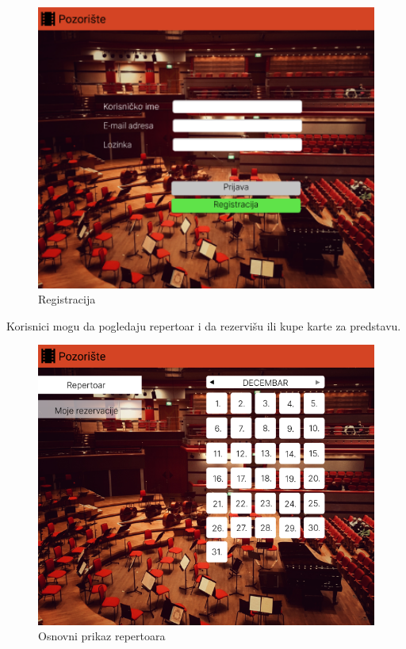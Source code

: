 \documentclass[a4paper]{article}
\begin{document}
\begin{figure}[H]
  \begin{center}
    \includegraphics[width=130mm]{../images/ui_klijent_registracija.png}
  \end{center}
  \caption{Registracija}
  \label{registracija_klijenta}
\end{figure}

Korisnici mogu da pogledaju repertoar i da rezervišu ili kupe karte za predstavu.

\begin{figure}[H]
  \begin{center}
    \includegraphics[width=130mm]{../images/ui_klijent_repertoar1.png}
  \end{center}
  \caption{Osnovni prikaz repertoara}
  \label{klijent_repertoar}
\end{figure}
\end{document}
